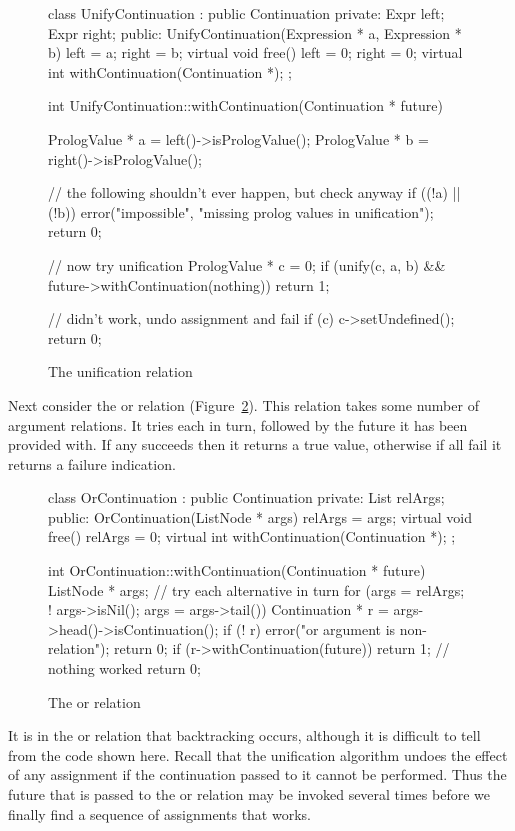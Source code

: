 \begin{figure}
\begin{cprog}
class UnifyContinuation : public Continuation {
private:
	Expr left;
	Expr right;
public:
	UnifyContinuation(Expression * a, Expression * b)
		{ left = a; right = b; }
	virtual void free()
		{ left = 0; right = 0; }
	virtual int withContinuation(Continuation *);
};

int UnifyContinuation::withContinuation(Continuation * future)
{
	PrologValue * a = left()->isPrologValue();
	PrologValue * b = right()->isPrologValue();

	// the following shouldn't ever happen, but check anyway
	if ((!a) || (!b)) {
		error("impossible", "missing prolog values in unification");
		return 0;
		}

	// now try unification
	PrologValue * c = 0;
	if (unify(c, a, b) && future->withContinuation(nothing))
		return 1;

	// didn't work, undo assignment and fail
	if (c) 
		c->setUndefined();
	return 0;
}
\end{cprog}
\caption{The unification relation}\label{unifyrel}
\end{figure}

Next consider the {\sf or} relation (Figure~\ref{orrel}).  
This relation takes some number of 
argument relations.  It tries each in turn, followed by the future it has
been provided with.  If any succeeds then it returns a true value,
otherwise if all fail it returns a failure indication.

\begin{figure}
\begin{cprog}
class OrContinuation : public Continuation {
private:
	List relArgs;
public:
	OrContinuation(ListNode * args) { relArgs = args; }
	virtual void free() { relArgs = 0; }
	virtual int withContinuation(Continuation *);
};

int OrContinuation::withContinuation(Continuation * future)
{
	ListNode * args;
	// try each alternative in turn
	for (args = relArgs; ! args->isNil(); args = args->tail()) {
		Continuation * r = args->head()->isContinuation();
		if (! r) {
			error("or argument is non-relation");
			return 0;
			}
		if (r->withContinuation(future)) return 1;
		}
	// nothing worked
	return 0;
}
\end{cprog}
\caption{The {\sf or} relation}\label{orrel}
\end{figure}

It is in the {\sf or} relation that backtracking occurs, although it is
difficult to tell from the code shown here.  Recall that the unification
algorithm undoes the effect of any assignment if the continuation passed to
it cannot be performed.  Thus the future that is passed to the {\sf or} 
relation may be invoked several times before we finally find a sequence of
assignments that works.

